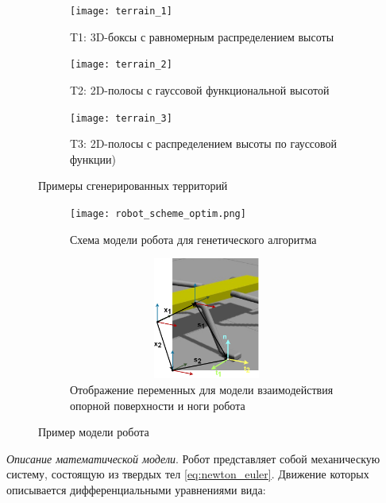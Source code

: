 \begin{figure}[h]
    \begin{subfigure}{0.33\textwidth}
    \centering\texttt{[image: terrain\_1]} 
    \caption{T1: 3D-боксы с равномерным распределением высоты}
    \label{fig:terrain_1}
    \end{subfigure}
    \begin{subfigure}{0.33\textwidth}
    \centering\texttt{[image: terrain\_2]} 
    \caption{T2: 2D-полосы с гауссовой функциональной высотой}
    \label{fig:terrain_2}
    \end{subfigure}
    \begin{subfigure}{0.33\textwidth}
    \centering\texttt{[image: terrain\_3]}
    \caption{T3: 2D-полосы с распределением высоты по гауссовой функции)}
    \label{fig:terrain_3}
    \end{subfigure}
     
    \caption{Примеры сгенерированных территорий}
    \label{fig:terrains}
\end{figure}


\begin{figure}[h]
    \begin{subfigure}[t]{0.59\textwidth}
        \centering\texttt{[image: robot\_scheme\_optim.png]}
        \caption{Схема модели робота для генетического алгоритма}
        \label{fig:best_gen_robot.jpg}
    \end{subfigure}
    \begin{subfigure}[t]{0.39\textwidth}
        \centering\includegraphics[height=4cm,width=1\textwidth,keepaspectratio]{images/Strirus_leg.drawio.png}
        \caption{Отображение переменных для модели взаимодействия опорной поверхности и ноги робота}
        \label{fig:contact_interaction.png}
    \end{subfigure}

\caption{Пример модели робота}
\end{figure}

\textit{Описание математической модели}. Робот представляет собой механическую систему, состоящую из твердых тел \eqref{eq:newton_euler}. Движение которых описывается дифференциальными уравнениями вида:

